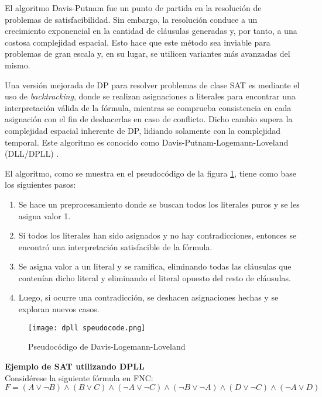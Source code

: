 \documentclass[12pt]{report}
\begin{document}
El algoritmo Davis-Putnam fue un punto de partida en la resolución de problemas de satisfacibilidad. Sin embargo, la resolución conduce a un crecimiento exponencial en la cantidad de cláusulas generadas y, por tanto, a una costosa complejidad espacial. Esto hace que este método sea inviable para problemas de gran escala y, en su lugar, se utilicen variantes más avanzadas del mismo.

Una versión mejorada de DP para resolver problemas de clase SAT es mediante el uso de \textit{backtracking}, donde se realizan asignaciones a literales para encontrar una interpretación válida de la fórmula, mientras se comprueba consistencia en cada asignación con el fin de deshacerlas en caso de conflicto. Dicho cambio supera la complejidad espacial inherente de DP, lidiando solamente con la complejidad temporal. Este algoritmo es conocido como Davis-Putnam-Logemann-Loveland (DLL/DPLL) \cite{D-L-L}.

El algoritmo, como se muestra en el pseudocódigo de la figura \ref{fig:dpll pc}, tiene como base los siguientes pasos:
\begin{enumerate}
    \item Se hace un preprocesamiento donde se buscan todos los literales puros y se les asigna valor 1.
    \item Si todos los literales han sido asignados y no hay contradicciones, entonces se encontró una interpretación satisfacible de la fórmula.
    \item Se asigna valor a un literal y se ramifica, eliminando todas las cláusulas que contenían dicho literal y eliminando el literal opuesto del resto de cláusulas.
    \item Luego, si ocurre una contradicción, se deshacen asignaciones hechas y se exploran nuevos casos.\\
\end{enumerate}

\begin{figure}[ht]
    \centering
    \texttt{[image: dpll speudocode.png]}
    \caption{Pseudocódigo de Davis-Logemann-Loveland}
    \label{fig:dpll pc}
\end{figure}

 
\textbf{Ejemplo de SAT utilizando DPLL}\\

Considérese la siguiente fórmula en FNC:
$F=(A\lor \neg B)\land(B\lor C)\land(\neg A\lor \neg C)\land(\neg B\lor \neg A)\land(D\lor \neg C)\land(\neg A\lor D)$\\
\end{document}
